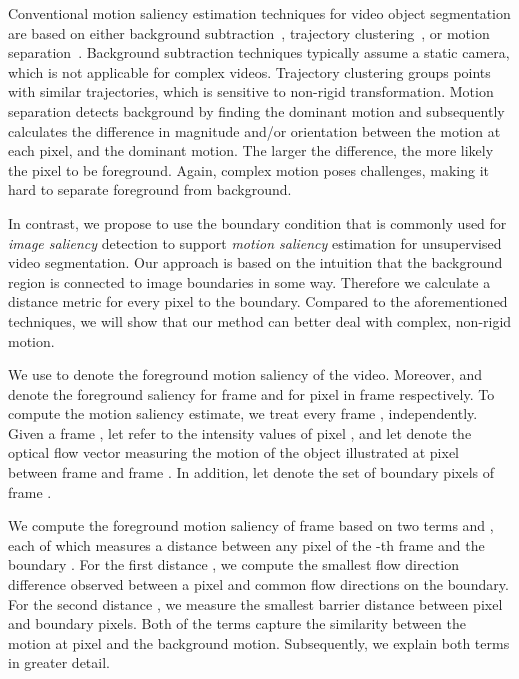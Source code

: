 \documentclass[runningheads]{llncs}
\begin{document}
Conventional motion saliency estimation techniques for video object segmentation are based on either background subtraction~\cite{BrutzerCVPR2011}, trajectory clustering~\cite{BroxECCV2010}, or motion separation~\cite{FaktorBMVC14}. Background subtraction techniques typically assume a static camera, which is not applicable for complex videos. Trajectory clustering groups points with similar trajectories, which is sensitive to non-rigid transformation.
Motion separation detects background by finding the dominant motion and subsequently calculates the difference in magnitude and/or orientation between the motion at each pixel, and the dominant motion. The larger the difference, the more likely the pixel to be foreground.
Again, complex motion poses challenges, making it hard to separate foreground from background. 

In contrast, we propose to use the boundary condition that is commonly used for \emph{image saliency} detection \cite{WeiECCV2012,TuCVPR16} to support \emph{motion saliency} estimation for unsupervised video segmentation. Our approach is based on the intuition that the background region is connected to image boundaries in some way. Therefore we calculate a distance metric for every pixel to the boundary. Compared to the aforementioned techniques, we will show that our method can better deal with complex, non-rigid motion. 

We use  to denote the foreground motion saliency of the video. Moreover,  and  denote the foreground saliency for frame  and for pixel  in frame  respectively. 
To compute the motion saliency estimate, we treat every frame ,  independently. Given a frame , let  refer to the intensity values of pixel , and let  denote the optical flow vector measuring the motion of the object illustrated at pixel  between frame  and frame . In addition, let  denote the set of boundary pixels of frame . 

We compute the foreground motion saliency  of frame  based on two terms  and , each of which measures a distance between any pixel  of the -th frame and the boundary . For the first distance , we compute the smallest flow direction difference observed between a pixel  and common flow directions on the boundary. For the second distance , we measure the smallest barrier distance between pixel  and boundary pixels. Both of the terms capture the similarity between the motion at pixel  and the background motion. Subsequently, we explain both terms in greater detail.
\end{document}
